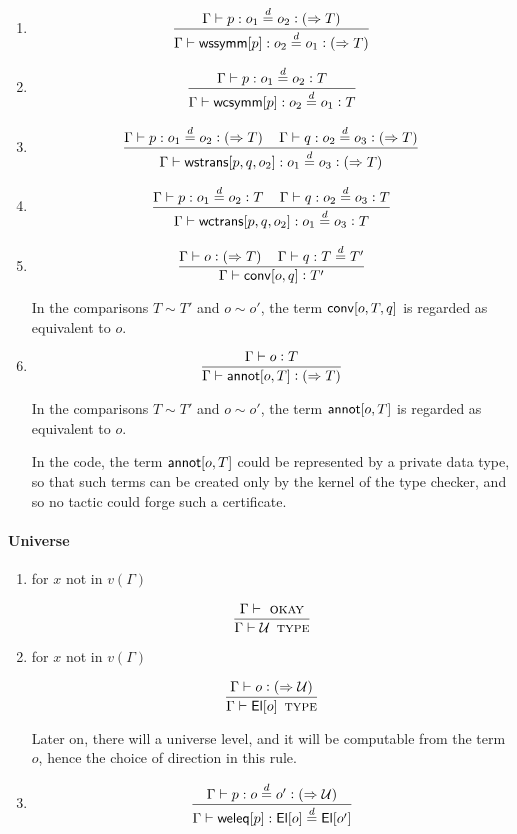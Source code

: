 \documentclass[11pt]{article}
\newcommand{\eqd}{\stackrel{d}{=}}
\newcommand{\Eu}{{\cal U}}
\newcommand{\spc}{{\,\,\,\,\,\,\,}}
\newcommand{\synth}[1]{\vcentcolon(\Rightarrow#1)} %
\newcommand{\ccheck}[1]{\vcentcolon#1}  %
\newcommand{\Type}{\mathop{\text{ \sc type}}}
\newcommand{\Okay}{\mathop{\text{ \sc okay}}}
\newcommand{\ha}[2]{#1[#2]}
\newcommand{\El}{{\sf El}}
\newcommand{\annot}{{\sf annot}}
\newcommand{\conv}{{\sf conv}}
\newcommand{\weleq}{{\sf weleq}}
\newcommand{\wssymm}{{\sf wssymm}}
\newcommand{\wcsymm}{{\sf wcsymm}}
\newcommand{\wstrans}{{\sf wstrans}}
\newcommand{\wctrans}{{\sf wctrans}}
\begin{document}
\begin{enumerate}
\item 
$$\frac{\Gamma\vdash p:o_1\eqd o_2 \synth{T}}{\Gamma\vdash \ha\wssymm{p}:o_2\eqd o_1 \synth{T}}$$

\item 
$$\frac{\Gamma\vdash p:o_1\eqd o_2 \ccheck{T}}{\Gamma\vdash \ha\wcsymm{p}:o_2\eqd o_1 \ccheck{T}}$$

\item 
$$\frac{\Gamma\vdash p:o_1\eqd o_2 \synth{T}\spc\Gamma\vdash q:o_2\eqd o_3 \synth{T}}{\Gamma\vdash \ha\wstrans{p,q,o_2}:o_1\eqd o_3 \synth{T}}$$

\item 
$$\frac{\Gamma\vdash p:o_1\eqd o_2 \ccheck{T}\spc\Gamma\vdash q:o_2\eqd o_3 \ccheck{T}}{\Gamma\vdash \ha\wctrans{p,q,o_2}:o_1\eqd o_3 \ccheck{T}}$$

\item 
$$\frac{\Gamma\vdash o \synth{T}\spc \Gamma\vdash q : T \eqd T'}{\Gamma\vdash \ha\conv{o,q} \ccheck{T'}}$$

In the comparisons $T\sim T'$ and $o\sim o'$, the term $\ha\conv{o,T,q}$ is regarded as equivalent to $o$.

\item 
$$\frac{\Gamma\vdash o \ccheck{T}}{\Gamma\vdash \ha\annot{o,T} \synth{T}}$$

In the comparisons $T\sim T'$ and $o\sim o'$, the term $\ha\annot{o,T}$ is regarded as equivalent to $o$.

In the code, the term $\ha\annot{o,T}$ could be represented by a private data
type, so that such terms can be created only by the kernel of the type checker,
and so no tactic could forge such a certificate.

\end{enumerate}

\paragraph{Universe}

\begin{enumerate}

\item for $x$ not in $v(\Gamma)$

$$\frac{\Gamma\vdash\Okay}{\Gamma \vdash \Eu\Type}$$

\item for $x$ not in $v(\Gamma)$

$$\frac{\Gamma\vdash o \synth{\Eu}}{\Gamma \vdash \ha\El{o}\Type}$$

Later on, there will a universe level, and it will be computable from the
term $o$, hence the choice of direction in this rule.

\item 

$$\frac{\Gamma\vdash p : o \eqd o' \synth{\Eu}}{\Gamma\vdash \ha\weleq{p} : \ha\El{o} \eqd \ha\El{o'}}$$

\end{enumerate}
\end{document}
